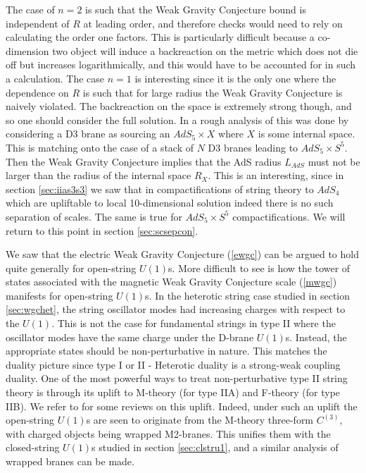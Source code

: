 \documentclass[11pt,a4paper]{article}
\numberwithin{equation}{section}
\numberwithin{table}{section}\setlength{\multlinegap}{25pt}
\begin{document}
The case of $n=2$ is such that the Weak Gravity Conjecture bound is independent of $R$ at leading order, and therefore checks would need to rely on calculating the order one factors. This is particularly difficult because a co-dimension two object will induce a backreaction on the metric which does not die off but increases logarithmically, and this would have to be accounted for in such a calculation. The case $n=1$ is interesting since it is the only one where the dependence on $R$ is such that for large radius the Weak Gravity Conjecture is naively violated. The backreaction on the space is extremely strong though, and so one should consider the full solution. In \cite{ArkaniHamed:2006dz} a rough analysis of this was done by considering a D3 brane as sourcing an $AdS_5 \times X$ where $X$ is some internal space. This is matching onto the case of a stack of $N$ D3 branes leading to $AdS_5 \times S^5$. Then the Weak Gravity Conjecture implies that the AdS radius $L_{AdS}$ must not be larger than the radius of the internal space $R_X$. This is an interesting, since in section \ref{sec:iias3s3} we saw that in compactifications of string theory to $AdS_4$ which are upliftable to local 10-dimensional solution indeed there is no such separation of scales. The same is true for $AdS_5 \times S^5$ compactifications. We will return to this point in section \ref{sec:scsepcon}.

We saw that the electric Weak Gravity Conjecture (\ref{ewgc}) can be argued to hold quite generally for open-string $U(1)$s. More difficult to see is how the tower of states associated with the magnetic Weak Gravity Conjecture scale (\ref{mwgc}) manifests for open-string $U(1)$s. In the heterotic string case studied in section \ref{sec:wgchet}, the string oscillator modes had increasing charges with respect to the $U(1)$. This is not the case for fundamental strings in type II where the oscillator modes have the same charge under the D-brane $U(1)$s. Instead, the appropriate states should be non-perturbative in nature. This matches the duality picture since type I or II - Heterotic duality is a strong-weak coupling duality. One of the most powerful ways to treat non-perturbative type II string theory is through its uplift to M-theory (for type IIA) and F-theory (for type IIB). We refer to \cite{Denef:2008wq,Weigand:2010wm,Weigand:2018rez} for some reviews on this uplift. Indeed, under such an uplift the open-string $U(1)$s are seen to originate from the M-theory three-form $C^{(3)}$, with charged objects being wrapped M2-branes. This unifies them with the closed-string $U(1)$s studied in section \ref{sec:clstru1}, and a similar analysis of wrapped branes can be made.   
\end{document}
